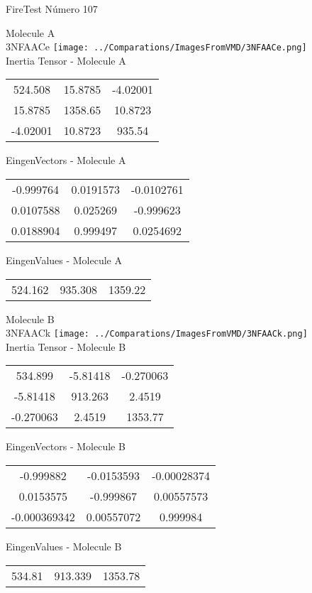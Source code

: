 \vtab[-2cm]
\begin{center}
{\large FireTest \tab Número 107}
\end{center}
\begin{multicols}{2}
\begin{center}

Molecule A \\ 
3NFAACe
\texttt{[image: ../Comparations/ImagesFromVMD/3NFAACe.png]}
\\
Inertia Tensor - Molecule A \\
\vtab

\begin{tabular}{|c c c|}
524.508	 & 	15.8785	 & 	-4.02001	 \\
15.8785	 & 	1358.65	 & 	10.8723	 \\
-4.02001	 & 	10.8723	 & 	935.54
\end{tabular}

\vtab
 EingenVectors - Molecule A     \\
\vtab
\begin{tabular}{|c c c|}
-0.999764	 & 	0.0191573	 & 	-0.0102761	 \\
0.0107588	 & 	0.025269	 & 	-0.999623	 \\
0.0188904	 & 	0.999497	 & 	0.0254692
\end{tabular}

\vtab
 EingenValues - Molecule A     \\
\vtab
\begin{tabular}{|c c c|}
524.162	 & 	935.308	 & 	1359.22	 \\
\end{tabular}
\columnbreak

Molecule B \\ 
3NFAACk
\texttt{[image: ../Comparations/ImagesFromVMD/3NFAACk.png]}
\\
Inertia Tensor - Molecule B \\
\vtab

\begin{tabular}{|c c c|}
534.899	 & 	-5.81418	 & 	-0.270063	 \\
-5.81418	 & 	913.263	 & 	2.4519	 \\
-0.270063	 & 	2.4519	 & 	1353.77
\end{tabular}

\vtab
 EingenVectors - Molecule B     \\
\vtab
\begin{tabular}{|c c c|}
-0.999882	 & 	-0.0153593	 & 	-0.00028374	 \\
0.0153575	 & 	-0.999867	 & 	0.00557573	 \\
-0.000369342	 & 	0.00557072	 & 	0.999984
\end{tabular}

\vtab
 EingenValues - Molecule B     \\
\vtab
\begin{tabular}{|c c c|}
534.81	 & 	913.339	 & 	1353.78	 \\
\end{tabular}

\end{center}
\end{multicols}
